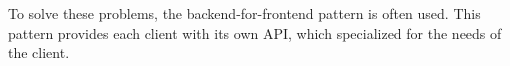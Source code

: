 






\fi

To solve these problems, the backend-for-frontend pattern is often used. This pattern provides each client with its own API, which specialized for the needs of the client. \cite{book:2018:richardson:microservices-patterns}

